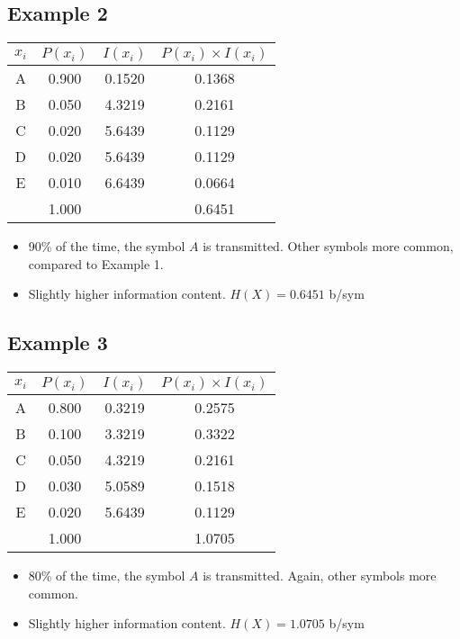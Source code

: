 \documentclass[a4paper,12pt]{article}
\begin{document}
	\subsection*{Example 2}
	\begin{center}\begin{tabular}{|c||c|c|c|}
			\hline
			\phantom{spa}  $x_i$	\phantom{spa} &	\phantom{spa}$P(x_i)$	\phantom{spa}&		\phantom{spa}$I(x_i)$\phantom{spa}&		$P(x_i) \times I(x_i)$	\\ \hline	\hline
			A	&	0.900	&	0.1520	&	0.1368	\\ \hline	
			B	&	0.050	&	4.3219	&	0.2161	\\ \hline	
			C	&	0.020	&	5.6439	&	0.1129	\\ \hline	
			D	&	0.020	&	5.6439	&	0.1129	\\ \hline	
			E	&	0.010	&	6.6439	&	0.0664	\\ \hline		\hline
			&	1.000	&		&	0.6451	\\ \hline	
		\end{tabular}  \end{center}
		\begin{itemize}
			\item 90\% of the time, the symbol $A$ is transmitted. Other symbols more common, compared to Example 1.
			\item Slightly higher information content. $H(X) = 0.6451 $ b/sym
		\end{itemize}
		\newpage
		\subsection*{Example 3}
		\begin{center}\begin{tabular}{|c||c|c|c|}
				\hline
				\phantom{spa}  $x_i$	\phantom{spa} &	\phantom{spa}$P(x_i)$	\phantom{spa}&		\phantom{spa}$I(x_i)$\phantom{spa}&		$P(x_i) \times I(x_i)$	\\ \hline	\hline
				A	&	0.800	&	0.3219	&	0.2575	\\ \hline	
				B	&	0.100	&	3.3219	&	0.3322	\\ \hline	
				C	&	0.050	&	4.3219	&	0.2161	\\ \hline	
				D	&	0.030	&	5.0589	&	0.1518	\\ \hline	
				E	&	0.020	&	5.6439	&	0.1129	\\ \hline		\hline
				&	1.000	&		&	1.0705	\\ \hline
			\end{tabular}  \end{center}
			\begin{itemize}
				\item 80\% of the time, the symbol $A$ is transmitted. Again, other symbols more common.
				\item Slightly higher information content. $H(X) = 1.0705 $ b/sym
			\end{itemize}
\end{document}
